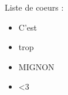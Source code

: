 \documentclass[a4paper]{article}
\begin{document}
    Liste de coeurs :
    \begin{itemize}[label= \Large,font=\color{magenta},parsep=0cm,itemsep=0cm]
        \item C'est
        \item trop
        \item MIGNON
        \item <3
    \end{itemize}
\end{document}
